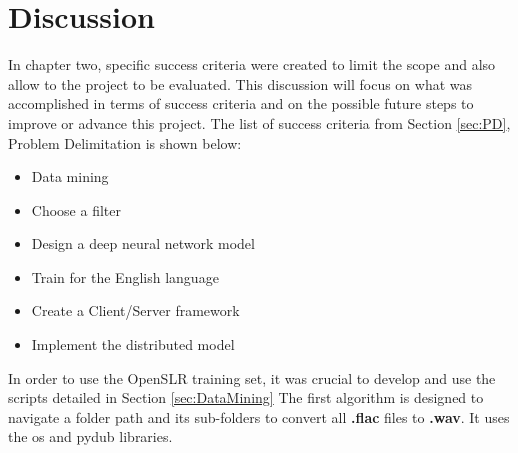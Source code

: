 \chapter{Discussion}\label{ch:discussion}

In chapter two, specific success criteria were created to limit the scope and also allow to the project to be evaluated. This discussion will focus on what was accomplished in terms of success criteria and on the possible future steps to improve or advance this project. The list of success criteria from Section \ref{sec:PD}, Problem Delimitation is shown below:

\begin{itemize}
	\item Data mining
	\item Choose a filter
	\item Design a deep neural network model
	\item Train for the English language
	\item Create a Client/Server framework
	\item Implement the distributed model
\end{itemize} 

In order to use the OpenSLR training set, it was crucial to develop and use the scripts detailed in Section \ref{sec:DataMining}
The first algorithm is designed to navigate a folder path and its sub-folders to convert all \textbf{.flac} files to \textbf{.wav}. It uses the os and pydub libraries. 